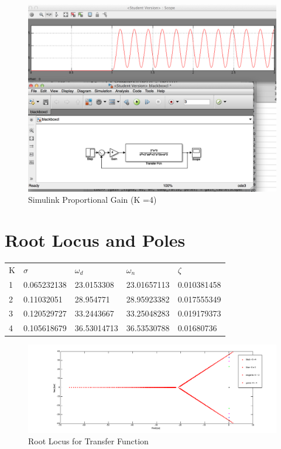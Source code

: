 \documentclass[english]{article}
\begin{document}
\begin{figure}[h!]
\includegraphics[width = \linewidth]{simulink2.png}
\caption{Simulink Proportional Gain (K =4)}
\end{figure}

\FloatBarrier
\section{Root Locus and Poles}
\begin{table}[h]
\begin{tabular}{|l|l|l|l|l|}
K & $\sigma $&$ \omega_d$ &$ \omega_n $&$ \zeta$ \\
1 & 0.065232138 & 23.0153308  & 23.01657113 & 0.010381458 \\
2 & 0.11032051  & 28.954771   & 28.95923382 & 0.017555349 \\
3 & 0.120529727 & 33.2443667  & 33.25048283 & 0.019179373 \\
4 & 0.105618679 & 36.53014713 & 36.53530788 & 0.01680736 
\end{tabular}
\end{table}
\begin{figure}[h!]
\includegraphics[width = \linewidth]{rlocusKcontroller.png}
\caption{Root Locus for Transfer Function}
\end{figure}
\FloatBarrier
\end{document}
